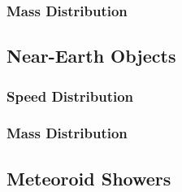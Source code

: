 \documentclass{article}
\begin{document}
\subsubsection{Mass Distribution}

	
\subsection{Near-Earth Objects}


\subsubsection{Speed Distribution}


\subsubsection{Mass Distribution}




\subsection{Meteoroid Showers}

	
\end{document}
